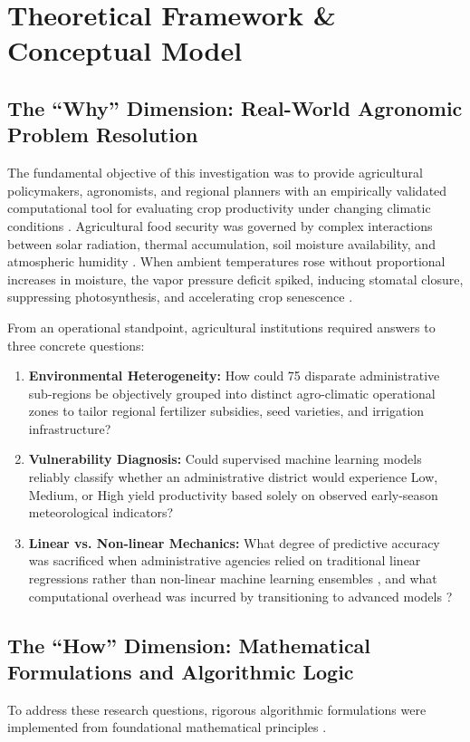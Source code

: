 \documentclass[conference]{IEEEtran}
\begin{document}
\section{Theoretical Framework \& Conceptual Model}

\subsection{The ``Why'' Dimension: Real-World Agronomic Problem Resolution}
The fundamental objective of this investigation was to provide agricultural policymakers, agronomists, and regional planners with an empirically validated computational tool for evaluating crop productivity under changing climatic conditions \cite{dhakal2023, crane2018, lobell2008}. Agricultural food security was governed by complex interactions between solar radiation, thermal accumulation, soil moisture availability, and atmospheric humidity \cite{schlenker2009, demartonne1926}. When ambient temperatures rose without proportional increases in moisture, the vapor pressure deficit spiked, inducing stomatal closure, suppressing photosynthesis, and accelerating crop senescence \cite{schlenker2009}.

From an operational standpoint, agricultural institutions required answers to three concrete questions:
\begin{enumerate}
    \item \textbf{Environmental Heterogeneity:} How could 75 disparate administrative sub-regions be objectively grouped into distinct agro-climatic operational zones \cite{macqueen1967, rousseeuw1987} to tailor regional fertilizer subsidies, seed varieties, and irrigation infrastructure?
    \item \textbf{Vulnerability Diagnosis:} Could supervised machine learning models \cite{breiman2001, cortes1995, quinlan1986} reliably classify whether an administrative district would experience Low, Medium, or High yield productivity based solely on observed early-season meteorological indicators?
    \item \textbf{Linear vs. Non-linear Mechanics:} What degree of predictive accuracy was sacrificed when administrative agencies relied on traditional linear regressions \cite{hoerl1970} rather than non-linear machine learning ensembles \cite{breiman2001}, and what computational overhead was incurred by transitioning to advanced models \cite{hastie2009}?
\end{enumerate}

\subsection{The ``How'' Dimension: Mathematical Formulations and Algorithmic Logic}
To address these research questions, rigorous algorithmic formulations were implemented from foundational mathematical principles \cite{hastie2009}.
\end{document}

